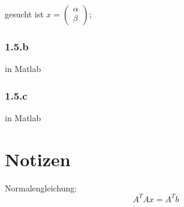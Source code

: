 gesucht ist $x = \begin{pmatrix*}
	\alpha\\\beta
\end{pmatrix*} $;

\subsubsection*{1.5.b}
in Matlab

\subsubsection*{1.5.c}
in Matlab


\section*{Notizen}

Normalengleichung:
\[
	A^T A x = A^T b
\]

